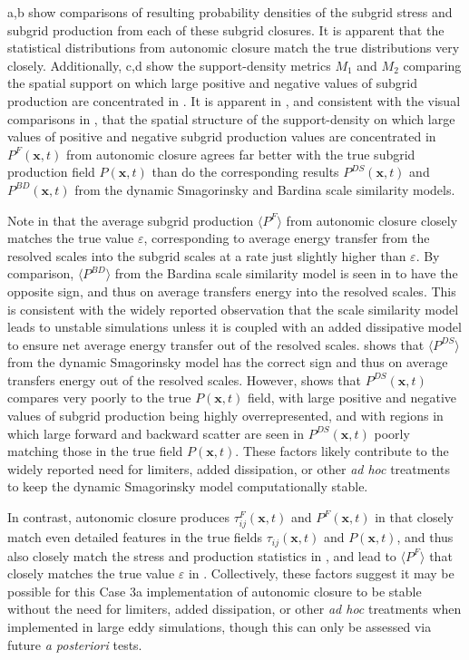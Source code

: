 a,b show comparisons of resulting probability densities of the subgrid stress and subgrid production from each of these subgrid closures. It is apparent that the statistical distributions from autonomic closure match the true distributions very closely.  Additionally, c,d show the support-density metrics $M_1$  and $M_2$   comparing the spatial support on which large positive and negative values of subgrid production are concentrated in . It is apparent in , and consistent with the visual comparisons in , that the spatial structure of the support-density on which large values of positive and negative subgrid production values are concentrated in  $P^{F}(\mathbf{x},t)$  from autonomic closure agrees far better with the true subgrid production field $P(\mathbf{x},t)$  than do the corresponding results $P^{DS}(\mathbf{x},t)$  and $P^{BD}(\mathbf{x},t)$ from the dynamic Smagorinsky and Bardina scale similarity models.

Note in  that the average subgrid production $\langle P^F \rangle$  from autonomic closure closely matches the true value $\varepsilon$, corresponding to average energy transfer from the resolved scales into the subgrid scales at a rate just slightly higher than $\varepsilon$. By comparison,  $\langle P^{BD} \rangle$ from the Bardina scale similarity model is seen in  to have the opposite sign, and thus on average transfers energy into the resolved scales. This is consistent with the widely reported observation that the scale similarity model leads to unstable simulations unless it is coupled with an added dissipative model to ensure net average energy transfer out of the resolved scales.  shows that $\langle P^{DS} \rangle$  from the dynamic Smagorinsky model has the correct sign and thus on average transfers energy out of the resolved scales. However,  shows that $P^{DS}(\mathbf{x},t)$  compares very poorly to the true  $P(\mathbf{x},t)$ field, with large positive and negative values of subgrid production being highly overrepresented, and with regions in which large forward and backward scatter are seen in  $P^{DS}(\mathbf{x},t)$ poorly matching those in the true field $P(\mathbf{x},t)$. These factors likely contribute to the widely reported need for limiters, added dissipation, or other \textit{ad hoc} treatments to keep the dynamic Smagorinsky model computationally stable. 

In contrast, autonomic closure produces $\tau_{ij}^F(\mathbf{x},t)$ and  $P^F(\mathbf{x},t)$ in  that closely match even detailed features in the true fields $\tau_{ij}(\mathbf{x},t)$ and  $P(\mathbf{x},t)$, and thus also closely match the stress and production statistics in , and lead to $\langle P^F \rangle$  that closely matches the true value $\varepsilon$ in . Collectively, these factors suggest it may be possible for this Case 3a implementation of autonomic closure to be stable without the need for limiters, added dissipation, or other \textit{ad hoc} treatments when implemented in large eddy simulations, though this can only be assessed via future \textit{a posteriori} tests. 

